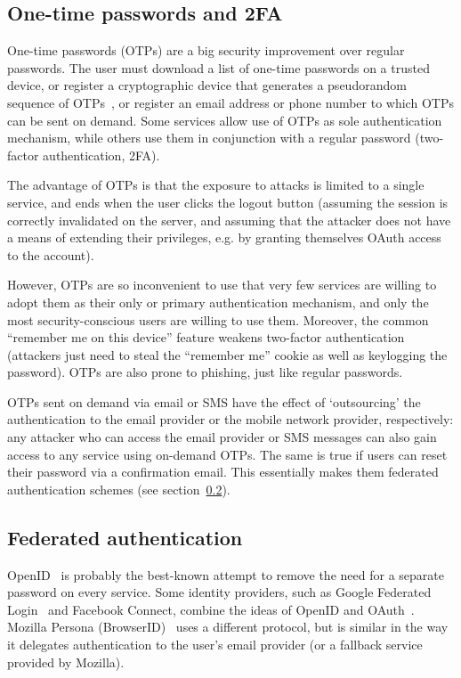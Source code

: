 \subsection{One-time passwords and 2FA}\label{sec:otp}

One-time passwords (OTPs) are a big security improvement over regular passwords. The user must
download a list of one-time passwords on a trusted device, or register a cryptographic device that
generates a pseudorandom sequence of OTPs~\cite{TOTP}, or register an email address or phone number
to which OTPs can be sent on demand. Some services allow use of OTPs as sole authentication
mechanism, while others use them in conjunction with a regular password (two-factor authentication,
2FA).

The advantage of OTPs is that the exposure to attacks is limited to a single service, and ends when
the user clicks the logout button (assuming the session is correctly invalidated on the server, and
assuming that the attacker does not have a means of extending their privileges, e.g. by granting
themselves OAuth access to the account).

However, OTPs are so inconvenient to use that very few services are willing to adopt them as their
only or primary authentication mechanism, and only the most security-conscious users are willing to
use them. Moreover, the common ``remember me on this device'' feature weakens two-factor
authentication (attackers just need to steal the ``remember me'' cookie as well as keylogging the
password). OTPs are also prone to phishing, just like regular passwords.

OTPs sent on demand via email or SMS have the effect of `outsourcing' the authentication to the
email provider or the mobile network provider, respectively: any attacker who can access the email
provider or SMS messages can also gain access to any service using on-demand OTPs. The same is true
if users can reset their password via a confirmation email. This essentially makes them federated
authentication schemes (see section~\ref{sec:federated}).

\subsection{Federated authentication}\label{sec:federated}

OpenID~\cite{OpenID} is probably the best-known attempt to remove the need for a separate password
on every service. Some identity providers, such as Google Federated Login~\cite{GoogleOpenID} and
Facebook Connect, combine the ideas of OpenID and OAuth~\cite{OAuth}. Mozilla Persona
(BrowserID)~\cite{Persona, BrowserID} uses a different protocol, but is similar in the way it
delegates authentication to the user's email provider (or a fallback service provided by Mozilla).

